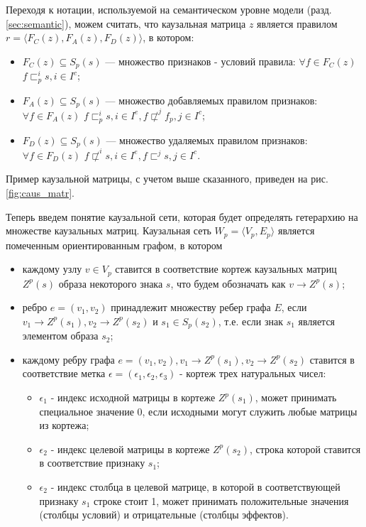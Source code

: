 \documentclass[12pt]{scrartcl}
\begin{document}
	Переходя к нотации, используемой на семантическом уровне модели (разд. \ref{sec:semantic}), можем считать, что каузальная матрица $z$ является правилом $r=\langle F_C(z),F_A(z),F_D(z)\rangle$, в котором:
	\begin{itemize}
		\item $F_C (z)\subseteq S_p(s)$ --- множество признаков - условий правила: $\forall f\in F_C(z)$ $f\sqsubset_p^i s, i\in I^c$;
		
		\item $F_A(z)\subseteq S_p(s)$ --- множество добавляемых правилом признаков: $\forall f\in F_A(z)$ $f\sqsubset_p^i s,i\in I^e, f\not\sqsubset^j f_p, j\in I^c$;
		
		\item $F_D(z)\subseteq S_p(s)$ --- множество удаляемых правилом признаков: $\forall f\in F_D(z)$ $f\not\sqsubset^i s, i\in I^e,f\sqsubset^j s, j\in I^c$.
	\end{itemize}

	Пример каузальной матрицы, с учетом выше сказанного, приведен на рис. \ref{fig:caus_matr}.
	
	
	Теперь введем понятие каузальной сети, которая будет определять гетерархию на множестве каузальных матриц. Каузальная сеть $W_p=\langle V_p, E_p \rangle$ является помеченным ориентированным графом, в котором
	\begin{itemize}
		\item каждому узлу $v\in V_p$ ставится в соответствие кортеж каузальных матриц $Z^p(s)$ образа некоторого знака $s$, что будем обозначать как $v\rightarrow Z^p(s)$;
		\item ребро $e=(v_1, v_2)$ принадлежит множеству ребер графа $E$, если $v_1\rightarrow Z^p(s_1), v_2\rightarrow Z^p(s_2)$ и $s_1\in S_p(s_2)$, т.е. если знак $s_1$ является элементом образа $s_2$;
		\item каждому ребру графа $e=(v_1, v_2), v_1\rightarrow Z^p(s_1), v_2\rightarrow Z^p(s_2)$ ставится в соответствие метка $\epsilon=(\epsilon_1,\epsilon_2,\epsilon_3)$ - кортеж трех натуральных чисел:
		\begin{itemize}
			\item $\epsilon_1$ - индекс исходной матрицы в кортеже $Z^p(s_1)$, может принимать специальное значение 0, если исходными могут служить любые матрицы из кортежа;
			\item $\epsilon_2$ - индекс целевой матрицы в кортеже $Z^p(s_2)$, строка которой ставится в соответствие признаку $s_1$;
			\item $\epsilon_2$ - индекс столбца в целевой матрице, в которой в соответствующей признаку $s_1$ строке стоит 1, может принимать положительные значения (столбцы условий) и отрицательные (столбцы эффектов).
		\end{itemize}		
	\end{itemize}
	
\end{document}
